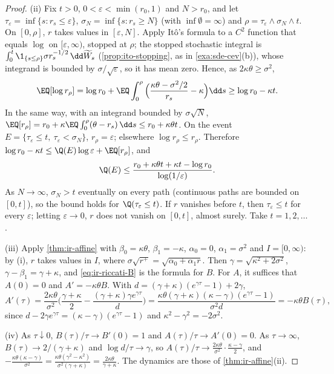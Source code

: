 \begin{proof}
(ii) Fix $t>0$, $0<\varepsilon<\min(r_0,1)$ and $N>r_0$, and let $\tau_\varepsilon=\inf\{s:r_s\le\varepsilon\}$,
$\sigma_N=\inf\{s:r_s\ge N\}$ (with $\inf\emptyset=\infty$) and $\rho=\tau_\varepsilon\wedge\sigma_N\wedge t$.
On $[0,\rho]$, $r$ takes values in $[\varepsilon,N]$. Apply It\^o's formula to a $C^2$ function that
equals $\log$ on $[\varepsilon,\infty)$, stopped at $\rho$; the stopped stochastic integral is
$\int_0^t\1_{\{s\le\rho\}}\sigma r_s^{-1/2}\,\dd\widetilde W_s$ (\cref{prop:ito-stopping}, as in
\cref{exa:sde-cev}(b)), whose integrand is bounded by $\sigma/\sqrt\varepsilon$, so it has mean zero.
Hence, as $2\kappa\theta\ge\sigma^2$,
\[
  \EQ[\log r_\rho]=\log r_0+\EQ\int_0^\rho\Big(\frac{\kappa\theta-\sigma^2/2}{r_s}-\kappa\Big)\dd s\ge\log r_0-\kappa t .
\]
In the same way, with an integrand bounded by $\sigma\sqrt N$,
$\EQ[r_\rho]=r_0+\kappa\EQ\int_0^\rho(\theta-r_s)\,\dd s\le r_0+\kappa\theta t$. On the event
$E=\{\tau_\varepsilon\le t,\ \tau_\varepsilon<\sigma_N\}$, $r_\rho=\varepsilon$; elsewhere
$\log r_\rho\le r_\rho$. Therefore
$\log r_0-\kappa t\le\Q(E)\log\varepsilon+\EQ[r_\rho]$, and
\[
  \Q(E)\le\frac{r_0+\kappa\theta t+\kappa t-\log r_0}{\log(1/\varepsilon)} .
\]
As $N\to\infty$, $\sigma_N>t$ eventually on every path (continuous paths are bounded on $[0,t]$),
so the bound holds for $\Q(\tau_\varepsilon\le t)$. If $r$ vanishes before $t$, then
$\tau_\varepsilon\le t$ for every $\varepsilon$; letting $\varepsilon\to0$, $r$ does not vanish on
$[0,t]$, almost surely. Take $t=1,2,\dots$.

(iii) Apply \cref{thm:ir-affine} with $\beta_0=\kappa\theta$, $\beta_1=-\kappa$, $\alpha_0=0$,
$\alpha_1=\sigma^2$ and $I=[0,\infty)$: by (i), $r$ takes values in $I$, where
$\sigma\sqrt{r^+}=\sqrt{\alpha_0+\alpha_1r}$. Then $\gamma=\sqrt{\kappa^2+2\sigma^2}$, $\gamma-\beta_1=\gamma+\kappa$,
and \eqref{eq:ir-riccati-B} is the formula for $B$. For $A$, it suffices that $A(0)=0$ and
$A'=-\kappa\theta B$. With $d=(\gamma+\kappa)(e^{\gamma\tau}-1)+2\gamma$,
\[
  A'(\tau)=\frac{2\kappa\theta}{\sigma^2}\Big(\frac{\gamma+\kappa}2-\frac{(\gamma+\kappa)\gamma e^{\gamma\tau}}{d}\Big)
  =\frac{\kappa\theta(\gamma+\kappa)(\kappa-\gamma)(e^{\gamma\tau}-1)}{\sigma^2d}=-\kappa\theta B(\tau),
\]
since $d-2\gamma e^{\gamma\tau}=(\kappa-\gamma)(e^{\gamma\tau}-1)$ and $\kappa^2-\gamma^2=-2\sigma^2$.

(iv) As $\tau\downarrow0$, $B(\tau)/\tau\to B'(0)=1$ and $A(\tau)/\tau\to A'(0)=0$. As $\tau\to\infty$,
$B(\tau)\to2/(\gamma+\kappa)$ and $\log d/\tau\to\gamma$, so
$A(\tau)/\tau\to\frac{2\kappa\theta}{\sigma^2}\cdot\frac{\kappa-\gamma}2$, and
$-\frac{\kappa\theta(\kappa-\gamma)}{\sigma^2}=\frac{\kappa\theta(\gamma^2-\kappa^2)}{\sigma^2(\gamma+\kappa)}=\frac{2\kappa\theta}{\gamma+\kappa}$.
The dynamics are those of \cref{thm:ir-affine}(ii).
\end{proof}

